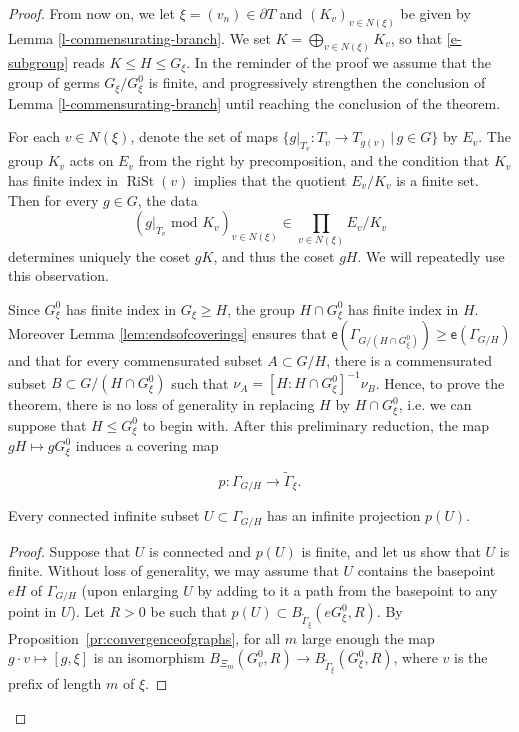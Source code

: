 \documentclass[10pt,a4paper]{amsart}
\newcommand{\Gammatilde}{\ensuremath{\widetilde{\Gamma}}}%
\newcommand{\arr}{\longrightarrow}
\newcommand{\esf}{\ensuremath{\mathsf{e}}}
\newcommand{\rist}{\ensuremath{\operatorname{RiSt}}}%
\begin{document}
\begin{proof}
From now on, we let $\xi=(v_n)\in \partial T$ and $(K_v)_{v\in N(\xi)}$ be given by Lemma \ref{l-commensurating-branch}. We set $K=\bigoplus_{v\in N(\xi)} K_v$, so that \eqref{e-subgroup} reads $K\le H\le G_\xi$. In the reminder of the proof we assume that the group of germs $G_\xi /G^0_\xi$ is finite, and progressively strengthen the conclusion of Lemma \ref{l-commensurating-branch} until reaching the conclusion of the theorem. 


For each $v\in N(\xi)$, denote the set of maps $\{g|_{T_v}\colon T_v\to T_{g(v)} \,  \vert \, g\in G\}$ by $E_v$.
The group $K_v$ acts on $E_v$ from the right by precomposition, and the condition that $K_v$ has finite index in $\rist(v)$ implies that the quotient $E_v/K_v$ is a finite set. Then for every $g\in G$, the data 
\[(g|_{T_v}\text{ mod }K_v)_{v\in N(\xi)}
\in \prod_{v\in N(\xi)} E_v/K_v\]
determines uniquely the coset $g K$, and thus the coset $gH$. We will repeatedly use this observation. 
 
Since $G^0_\xi$ has finite index in $G_\xi\ge H$, the group $H\cap G^0_\xi$ has finite index in $H$. Moreover Lemma \ref{lem:endsofcoverings} ensures that $\esf(\Gamma_{G/(H\cap G^0_\xi)})\ge \esf(\Gamma_{G/H})$  and that for every commensurated subset $A\subset{G/H}$, there is a commensurated subset $B\subset {G/(H\cap G^0_\xi)}$  such that $\nu_A=[H\colon H\cap G^0_\xi]^{-1}\nu_B$.  Hence, to prove the theorem, there is no loss of generality in replacing $H$ by $H \cap G^0_\xi$, i.e. we can suppose that $H\le G^0_\xi$ to begin with. After this preliminary reduction,  the map $gH\mapsto gG^0_\xi$ induces a covering map 

\[p\colon \Gamma_{G/H}\to  \widetilde{\Gamma}_\xi.\]


\begin{lemma}\label{l-fiber-disconnected}
Every connected infinite subset $U\subset \Gamma_{G/H}$ has an infinite projection $p(U)$.
\end{lemma}
\begin{proof}
Suppose that $U$ is connected and $p(U)$ is finite, and let us show that $U$ is finite. Without loss of generality, we may assume that $U$ contains the basepoint $eH$ of $\Gamma_{G/H}$ (upon enlarging $U$ by adding to it a path from the basepoint to any point in $U$). Let $R>0$ be such that $p(U)\subset B_{\Gammatilde_\xi}(eG^0_\xi, R)$. By Proposition~\ref{pr:convergenceofgraphs}, for all $m$ large enough the map $g\cdot v\mapsto [g, \xi]$ is an isomorphism $B_{\Xi_m}(G^0_v, R)\arr B_{\Gammatilde_\xi}(G^0_\xi, R)$, where $v$ is the prefix of length $m$ of $\xi$.


\end{proof}
\end{proof}
\end{document}
